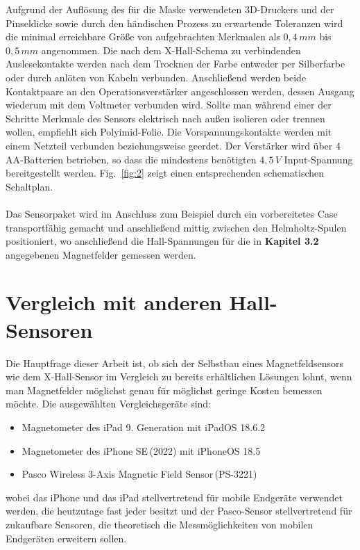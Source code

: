 \documentclass[12pt, a4paper]{article}
\begin{document}
Aufgrund der Auflösung des für die Maske verwendeten 3D-Druckers und der Pinseldicke sowie durch den händischen Prozess zu erwartende Toleranzen wird die minimal erreichbare Größe von aufgebrachten Merkmalen als $0,4\,mm$ bis $0,5\,mm$ angenommen.\newline
Die nach dem X-Hall-Schema zu verbindenden Auslesekontakte werden nach dem Trocknen der Farbe entweder per Silberfarbe oder durch anlöten von Kabeln verbunden. Anschließend werden beide Kontaktpaare an den Operationsverstärker angeschlossen werden, dessen Ausgang wiederum mit dem Voltmeter verbunden wird.\newline
Sollte man während einer der Schritte Merkmale des Sensors elektrisch nach außen isolieren oder trennen wollen, empfiehlt sich Polyimid-Folie.\newline
Die Vorspannungskontakte werden mit einem Netzteil verbunden beziehungsweise geerdet. Der Verstärker wird über 4 AA-Batterien betrieben, so dass die mindestens benötigten $4,5\,V$ Input-Spannung bereitgestellt werden. Fig.~\ref{fig:2} zeigt einen entsprechenden schematischen Schaltplan.\paragraph{}
Das Sensorpaket wird im Anschluss zum Beispiel durch ein vorbereitetes Case transportfähig gemacht und anschließend mittig zwischen den Helmholtz-Spulen positioniert, wo anschließend die Hall-Spannungen für die in \textbf{Kapitel 3.2} angegebenen Magnetfelder gemessen werden.


\section{Vergleich mit anderen Hall-Sensoren}


Die Hauptfrage dieser Arbeit ist, ob sich der Selbstbau eines Magnetfeldsensors wie dem X-Hall-Sensor im Vergleich zu bereits erhältlichen Lösungen lohnt, wenn man Magnetfelder möglichst genau für möglichst geringe Kosten bemessen möchte.\newline
Die ausgewählten Vergleichsgeräte sind:
\begin{itemize}
	\item Magnetometer des iPad 9. Generation mit iPadOS 18.6.2
	\item Magnetometer des iPhone SE\,(2022) mit iPhoneOS 18.5
	\item Pasco Wireless 3-Axis Magnetic Field Sensor\,(PS-3221) 
\end{itemize} 
wobei das iPhone und das iPad stellvertretend für mobile Endgeräte verwendet werden, die heutzutage fast jeder besitzt und der Pasco-Sensor stellvertretend für zukaufbare Sensoren, die theoretisch die Messmöglichkeiten von mobilen Endgeräten erweitern sollen.
\end{document}
